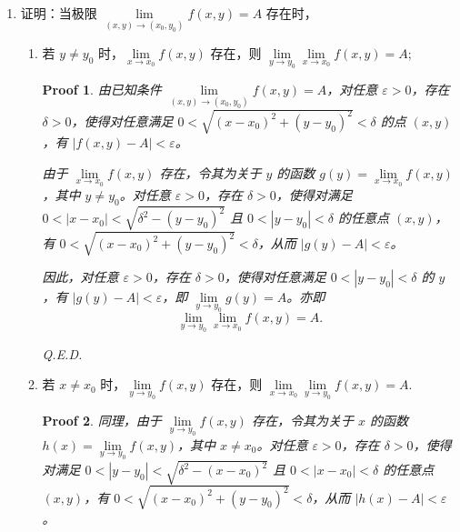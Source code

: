 \documentclass[a4paper,12pt]{article}
\newtheorem*{pf}{Proof}
\newtheorem*{sol}{Solution}
\begin{document}
\begin{enumerate}
\begin{enumerate}[label=(\arabic*)]
\begin{sol}
                              由第 (10) 小题可知，$\lim\limits_{\substack{x \to 0 \\ y \to 0}} \frac{xy}{x+y}$ 极限不存在，因此原极限也不存在。
                        \end{sol}
            \end{enumerate}

      \item[16.] 证明：当极限 $\lim\limits_{(x,y)\to(x_0,y_0)} f(x,y) = A$ 存在时，
            \begin{enumerate}[label=(\arabic*)]
                  \item 若 $y \neq y_0$ 时，$\lim\limits_{x \to x_0} f(x,y)$ 存在，则 $\lim\limits_{y \to y_0} \lim\limits_{x \to x_0} f(x,y) = A$;
                        \begin{pf}
                              由已知条件 $\lim\limits_{(x,y)\to(x_0,y_0)} f(x,y) = A$，对任意 $\varepsilon > 0$，存在 $\delta > 0$，使得对任意满足 $0 < \sqrt{(x-x_0)^2+(y-y_0)^2} < \delta$ 的点 $(x,y)$，有 $|f(x,y)-A| < \varepsilon$。

                              由于 $\lim\limits_{x \to x_0} f(x,y)$ 存在，令其为关于 $y$ 的函数 $g(y) = \lim\limits_{x \to x_0} f(x,y)$，其中 $y \neq y_0$。对任意 $\varepsilon > 0$，存在 $\delta > 0$，使得对满足 $0 < |x-x_0| < \sqrt{\delta^2-(y-y_0)^2}$ 且 $0 < |y-y_0| < \delta$ 的任意点 $(x,y)$，有 $0 < \sqrt{(x-x_0)^2+(y-y_0)^2} < \delta$，从而 $|g(y)-A| < \varepsilon$。

                              因此，对任意 $\varepsilon > 0$，存在 $\delta > 0$，使得对任意满足 $0 < |y-y_0| < \delta$ 的 $y$，有 $|g(y)-A| < \varepsilon$，即 $\lim\limits_{y \to y_0} g(y) = A$。亦即
                              $$
                                    \lim_{y \to y_0} \lim_{x \to x_0} f(x,y) = A.
                              $$

                              Q.E.D.
                        \end{pf}
                  \item 若 $x \neq x_0$ 时，$\lim\limits_{y \to y_0} f(x,y)$ 存在，则 $\lim\limits_{x \to x_0} \lim\limits_{y \to y_0} f(x,y) = A$.
                        \begin{pf}
                              同理，由于 $\lim\limits_{y \to y_0} f(x,y)$ 存在，令其为关于 $x$ 的函数 $h(x) = \lim\limits_{y \to y_0} f(x,y)$，其中 $x \neq x_0$。对任意 $\varepsilon > 0$，存在 $\delta > 0$，使得对满足 $0 < |y-y_0| < \sqrt{\delta^2-(x-x_0)^2}$ 且 $0 < |x-x_0| < \delta$ 的任意点 $(x,y)$，有 $0 < \sqrt{(x-x_0)^2+(y-y_0)^2} < \delta$，从而 $|h(x)-A| < \varepsilon$。


\end{pf}
\end{enumerate}
\end{enumerate}
\end{document}
